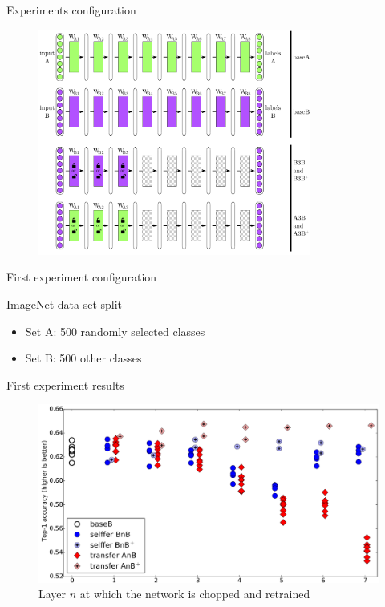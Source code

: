 \documentclass[xcolor=pdftex,dvipsnames,table,mathserif]{beamer}
\begin{document}
\begin{frame}{Experiments configuration}

  \begin{figure}[ht]
    \centering
    \includegraphics[width=0.8\textwidth]{transfer_learning_exp}\\
  \end{figure}

\end{frame}


\begin{frame}{First experiment configuration}

  \begin{block}{ImageNet data set split}
    \begin{itemize}
    \item Set A: 500 randomly selected classes
    \item Set B: 500 other classes
    \end{itemize}
  \end{block}

\end{frame}


\begin{frame}{First experiment results}

  \begin{figure}[ht]
    \centering
    \includegraphics[width=\textwidth]{transfer_learning_res_1}\\
    \scriptsize{Layer $n$ at which the network is chopped and retrained}
  \end{figure}

\end{frame}
\end{document}
